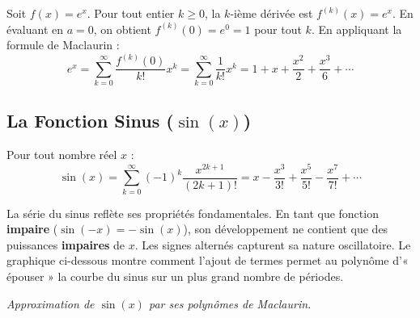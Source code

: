 \begin{proofbox}
Soit $f(x) = e^x$. Pour tout entier $k \ge 0$, la $k$-ième dérivée est $f^{(k)}(x) = e^x$. En évaluant en $a=0$, on obtient $f^{(k)}(0) = e^0 = 1$ pour tout $k$. En appliquant la formule de Maclaurin :
$$ e^x = \sum_{k=0}^{\infty} \frac{f^{(k)}(0)}{k!} x^k = \sum_{k=0}^{\infty} \frac{1}{k!} x^k = 1 + x + \frac{x^2}{2} + \frac{x^3}{6} + \cdots $$
\end{proofbox}


\subsection{La Fonction Sinus ($\sin(x)$)}

\begin{theorembox}
Pour tout nombre réel $x$ :
$$ \sin(x) = \sum_{k=0}^{\infty} (-1)^k \frac{x^{2k+1}}{(2k+1)!} = x - \frac{x^3}{3!} + \frac{x^5}{5!} - \frac{x^7}{7!} + \cdots $$
\end{theorembox}

\begin{intuitionbox}
La série du sinus reflète ses propriétés fondamentales. En tant que fonction \textbf{impaire} ($ \sin(-x) = -\sin(x) $), son développement ne contient que des puissances \textbf{impaires} de $x$. Les signes alternés capturent sa nature oscillatoire. Le graphique ci-dessous montre comment l'ajout de termes permet au polynôme d'« épouser » la courbe du sinus sur un plus grand nombre de périodes.

\tcblower

\centering
{}
\par\small\textit{Approximation de $\sin(x)$ par ses polynômes de Maclaurin.}
\end{intuitionbox}

